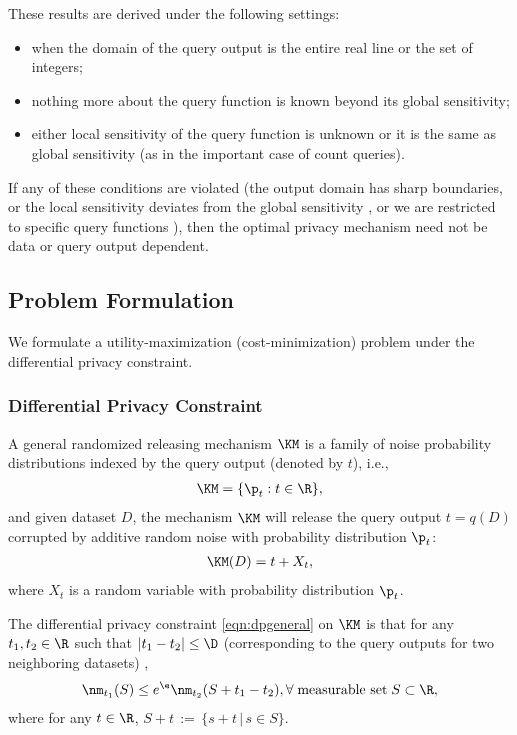 These results are derived under the following settings:
\begin{itemize}
\item when the domain of the query output is the entire real line or the set of integers;
\item nothing more about the query function is known beyond its global sensitivity;
\item either local sensitivity \cite{NRS07} of the query function is unknown or it is the same as global sensitivity (as in the important case of count queries).
\end{itemize}
If any of these conditions are violated (the output domain has sharp boundaries, or the local sensitivity deviates from the global sensitivity \cite{NRS07}, or we are restricted to specific query functions \cite{CM08}), then the optimal privacy mechanism need not be data or query output dependent.







\subsection{Problem Formulation}

We formulate a utility-maximization (cost-minimization) problem under the differential privacy constraint.

\subsubsection{Differential Privacy Constraint}
A general randomized releasing mechanism $\KM$ is a family of noise probability distributions indexed by  the query output (denoted by $t$), i.e.,
\begin{align}
 	\KM = \{\p_t : t \in \R \},
 \end{align}
and given dataset $D$, the mechanism $\KM$ will release the query output $t = q(D)$ corrupted by additive random noise with probability distribution $\p_t$:
\begin{align}
    \KM(D) = t + X_{t},
\end{align}
where $X_{t}$ is a random variable with probability distribution $\p_{t}$.


The differential privacy constraint \eqref{eqn:dpgeneral}    on $\KM$ is that for any $t_1,t_2 \in \R$ such that $|t_1 - t_2| \le \D $ (corresponding to the query outputs for two neighboring datasets) ,
\begin{align}
	\nm_{t_1} (S) \le e^{\e} \nm_{t_2}(S + t_1 - t_2), \forall \; \text{measurable set} \; S \subset \R,  \label{eqn:diffgeneralnoise1}
\end{align}
where for any $t \in \R$,  $S+t \, := \, \{s+t \, | \, s \in S\}$.

